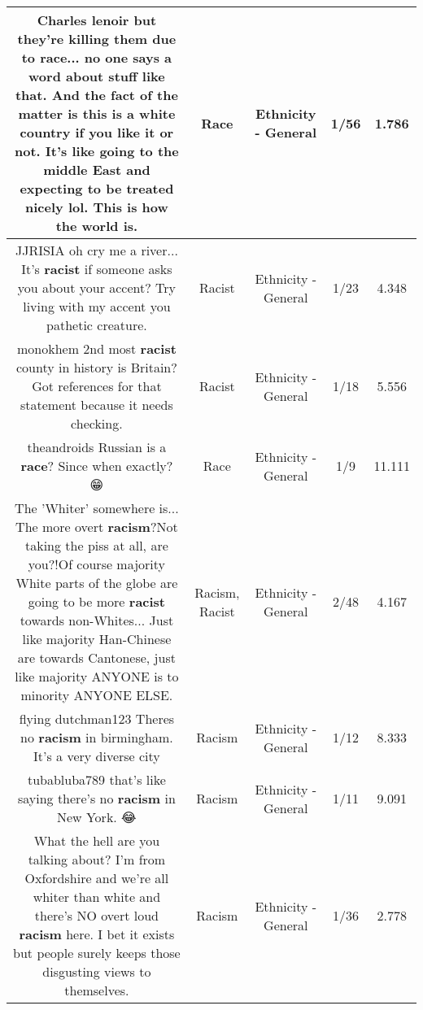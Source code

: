 \documentclass[11pt]{article}
\newlength\mylength
\begin{document}
\begin{center}
\begin{longtable}{|C{.65\mylength}|C{.30\mylength}|C{.12\mylength}|C{.12\mylength}|C{.12\mylength}|}
  \small Charles lenoir but they're killing them due to \textbf{race}... no one says a word about stuff like that. And the fact of the matter is this is a white country if you like it or not. It's like going to the middle East and expecting to be treated nicely lol. This is how the world is.\normalsize   & Race & Ethnicity - General & 1/56 & 1.786 \\  \hline
  \small JJRISIA oh cry me a river... It's \textbf{racist} if someone asks you about your accent? Try living with my accent you pathetic creature.\normalsize   & Racist & Ethnicity - General & 1/23 & 4.348 \\  \hline
  \small monokhem 2nd most \textbf{racist} county in history is Britain? Got references for that statement because it needs checking.\normalsize   & Racist & Ethnicity - General & 1/18 & 5.556 \\  \hline
  \small theandroids Russian is a \textbf{race}? Since when exactly? 😁\normalsize   & Race & Ethnicity - General & 1/9 & 11.111 \\  \hline
  \small The 'Whiter' somewhere is... The more overt \textbf{racism}?Not taking the piss at all, are you?!Of course majority White parts of the globe are going to be more \textbf{racist} towards non-Whites... Just like majority Han-Chinese are towards Cantonese, just like majority ANYONE is to minority ANYONE ELSE.\normalsize   & Racism, Racist & Ethnicity - General & 2/48 & 4.167 \\  \hline
  \small flying dutchman123 Theres no \textbf{racism} in birmingham. It's a very diverse city\normalsize   & Racism & Ethnicity - General & 1/12 & 8.333 \\  \hline
  \small tubabluba789 that's like saying there's no \textbf{racism} in New York. 😂\normalsize   & Racism & Ethnicity - General & 1/11 & 9.091 \\  \hline
  \small What the hell are you talking about? I'm from Oxfordshire and we're all whiter than white and there's NO overt loud \textbf{racism} here. I bet it exists but people surely keeps those disgusting views to themselves.\normalsize   & Racism & Ethnicity - General & 1/36 & 2.778 \\  \hline

\end{longtable}
\end{center}
\end{document}
